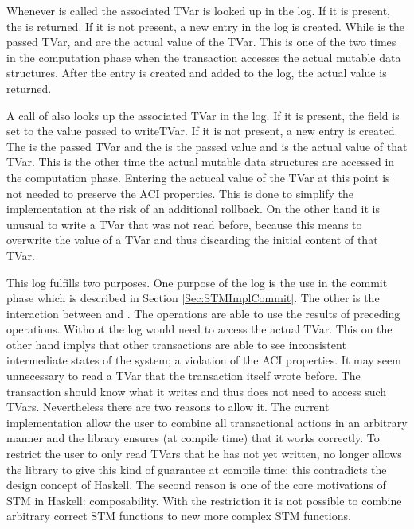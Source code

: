 Whenever  is called the associated TVar is looked up in the log.
If it is present, the  is returned. If it is not present, a new entry in the log is created. While 
is the passed TVar,  and  are the actual value of the TVar.
This is one of the two times in the computation phase when the transaction accesses the actual mutable data structures.  
After the entry is created and added to the log, the actual value is returned. 

A call of  also looks up the associated TVar in the log. If it is present, the field  is 
set to the value passed to writeTVar. If it is not present, a new entry is created. The  is the passed TVar and
the  is the passed value and  is the actual value of that TVar. This is the other time 
the actual mutable data structures are accessed in the computation phase. Entering the actucal value of the TVar at this
point is not needed to preserve the ACI properties. This is done to simplify the implementation at the risk of an additional
rollback. On the other hand it is unusual to write a TVar that was not read before, because this means to overwrite the 
value of a TVar and thus discarding the initial content of that TVar.

This log fulfills two purposes. One purpose of the log is the use in the commit phase which is described in Section \ref{Sec:STMImplCommit}.
The other is the interaction between  and . The  operations are able to use the results 
of preceding  operations. Without the log  would need to access the actual TVar. This on the 
other hand implys that other transactions are able to see inconsistent intermediate states of the system;
a violation of the ACI properties. It may seem unnecessary to read a TVar that the transaction itself wrote before.
The transaction should know what it writes and thus does not need to access such TVars. Nevertheless there are two reasons 
to allow it. The current implementation allow the user to combine all transactional actions in an arbitrary manner and 
the library ensures (at compile time) that it works correctly. To restrict the user to only read TVars that he has
not yet written, no longer allows the library to give this kind of guarantee at compile time; this contradicts
the design concept of Haskell. The second reason is one of the core motivations of STM in Haskell: composability.
With the restriction it is not possible to combine arbitrary correct STM functions to new more complex STM
functions. 

